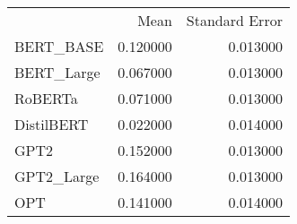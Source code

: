 \begin{tabular}{lrr}
 & Mean & Standard Error \\
BERT_BASE & 0.120000 & 0.013000 \\
BERT_Large & 0.067000 & 0.013000 \\
RoBERTa & 0.071000 & 0.013000 \\
DistilBERT & 0.022000 & 0.014000 \\
GPT2 & 0.152000 & 0.013000 \\
GPT2_Large & 0.164000 & 0.013000 \\
OPT & 0.141000 & 0.014000 \\
\end{tabular}
